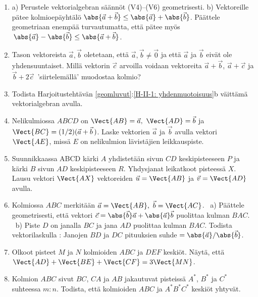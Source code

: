 \Harj
\begin{enumerate}

\item \label{H-II-1: perusteluja}
a) Perustele vektorialgebran säännöt (V4)--(V6) geometrisesti. \vspace{1mm}\newline
b) Vektoreille pätee kolmioepäyhtälö
$\abs{\vec a+\vec b} \le \abs{\vec a}+\abs{\vec b}$. Päättele geometriaan enempää
turvautumatta, että pätee myös $\,\abs{\vec a}-\abs{\vec b} \le \abs{\vec a+\vec b}$. 

\item
Tason vektoreista $\vec a,\vec b$ oletetaan, että $\vec a,\vec b\neq\vec 0$ ja että
$\vec a$ ja $\vec b$ eivät ole yhdensuuntaiset. Millä vektorin $\vec c$ arvoilla voidaan
vektoreita $\vec a+\vec b$, $\vec a+\vec c$ ja $\vec b+2\vec c\,$ 'siirtelemällä' muodostaa
kolmio?

\item
Todista Harjoitustehtävän \ref{geomluvut}:\ref{H-II-1: yhdenmuotoisuus}b väittämä
vektorialgebran avulla.

\item
Nelikulmiossa $ABCD$ on $\Vect{AB} = \vec{a},\ \Vect{AD} = \vec{b}$ ja
$\Vect{BC} = (1/2)(\vec{a} + \vec{b}\,)$. Laske vektorien $\vec{a}$ ja $\vec{b}$
avulla vektori $\Vect{AE}$, missä $E$ on nelikulmion lävistäjien leikkauspiste.

\item
Suunnikkaassa ABCD kärki $A$ yhdistetään sivun $CD$ keskipisteeseen $P$ ja kärki $B$ sivun
$AD$ keskipisteeseen $R$. Yhdysjanat leikatkoot pisteessä $X$. Lausu vektori $\Vect{AX}$
vektoreiden $\vec u=\Vect{AB}$ ja $\vec v=\Vect{AD}$ avulla.

\item
Kolmiossa $ABC$ merkitään $\vec a=\Vect{AB},\ \vec b=\Vect{AC}$. \ a) Päättele geometrisesti,
että vektori $\vec c=\abs{\vec b}\vec a+\abs{\vec a}\vec b$ puolittaa kulman $BAC$. \
b) Piste $D$ on janalla $BC$ ja jana $AD$ puolittaa kulman $BAC$. Todista vektorilaskulla
\kor{kulmanpuolittajalause}: Janojen $BD$ ja $DC$ pituuksien suhde
$=\abs{\vec a}/\abs{\vec b}$.

\item
Olkoot pisteet $M$ ja $N$ kolmioiden $ABC$ ja $DEF$ keskiöt. Näytä, että \newline
$\Vect{AD}+\Vect{BE}+\Vect{CF}=3\Vect{MN}$.

\item
Kolmion $ABC$ sivut $BC$, $CA$ ja $AB$ jakautuvat pisteissä $A^*$, $B^*$ ja $C^*$ suhteessa
$m:n$. Todista, että kolmioiden $ABC$ ja $A^*B^*C^*$ keskiöt yhtyvät.


\end{enumerate}
